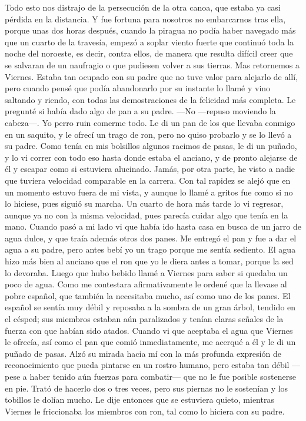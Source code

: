 \documentclass{novela}
\begin{document}
    Todo esto nos distrajo de la persecución de la otra canoa, que estaba ya casi pérdida en la distancia. Y fue fortuna para nosotros no embarcarnos tras ella, porque unas dos horas después, cuando la piragua no podía haber navegado más que un cuarto de la travesía, empezó a soplar viento fuerte que continuó toda la noche del noroeste, es decir, contra ellos, de manera que resulta difícil creer que se salvaran de un naufragio o que pudiesen volver a sus tierras.
    Mas retornemos a Viernes. Estaba tan ocupado con su padre que no tuve valor para alejarlo de allí, pero cuando pensé que podía abandonarlo por su instante lo llamé y vino saltando y riendo, con todas las demostraciones de la felicidad más completa. Le pregunté si había dado algo de pan a su padre.
    —No —repuso moviendo la cabeza—. Yo perro ruin comerme todo.
    Le di un pan de los que llevaba conmigo en un saquito, y le ofrecí un trago de ron, pero no quiso probarlo y se lo llevó a su padre. Como tenía en mis bolsillos algunos racimos de pasas, le di un puñado, y lo vi correr con todo eso hasta donde estaba el anciano, y de pronto alejarse de él y escapar como si estuviera alucinado. Jamás, por otra parte, he visto a nadie que tuviera velocidad comparable en la carrera. Con tal rapidez se alejó que en un momento estuvo fuera de mi vista, y aunque lo llamé a gritos fue como si no lo hiciese, pues siguió su marcha. Un cuarto de hora más tarde lo vi regresar, aunque ya no con la misma velocidad, pues parecía cuidar algo que tenía en la mano.
    Cuando pasó a mi lado vi que había ido hasta casa en busca de un jarro de agua dulce, y que traía además otros dos panes. Me entregó el pan y fue a dar el agua a su padre, pero antes bebí yo un trago porque me sentía sediento. El agua hizo más bien al anciano que el ron que yo le diera antes a tomar, porque la sed lo devoraba.
    Luego que hubo bebido llamé a Viernes para saber si quedaba un poco de agua. Como me contestara afirmativamente le ordené que la llevase al pobre español, que también la necesitaba mucho, así como uno de los panes. El español se sentía muy débil y reposaba a la sombra de un gran árbol, tendido en el césped; sus miembros estaban aún paralizados y tenían claras señales de la fuerza con que habían sido atados. Cuando vi que aceptaba el agua que Viernes le ofrecía, así como el pan que comió inmediatamente, me acerqué a él y le di un puñado de pasas. Alzó su mirada hacia mí con la más profunda expresión de reconocimiento que pueda pintarse en un rostro humano, pero estaba tan débil —pese a haber tenido aún fuerzas para combatir— que no le fue posible sostenerse en pie. Trató de hacerlo dos o tres veces, pero sus piernas no le sostenían y los tobillos le dolían mucho. Le dije entonces que se estuviera quieto, mientras Viernes le friccionaba los miembros con ron, tal como lo hiciera con su padre.
\end{document}
